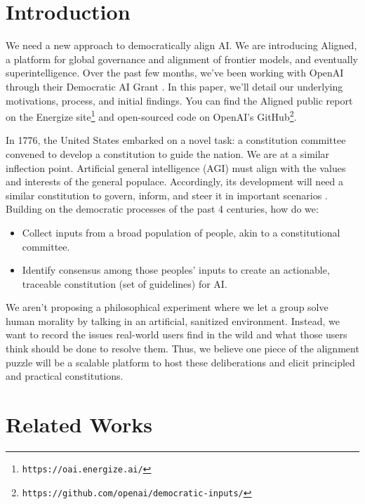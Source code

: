 \documentclass{article}
\begin{document}
\begin{multicols}{2}
\section{Introduction}

We need a new approach to democratically align AI. We are introducing Aligned, a platform for global governance and alignment of frontier models, and eventually superintelligence. Over the past few months, we’ve been working with OpenAI through their Democratic AI Grant \cite{zaremba2023democratic}. In this paper, we’ll detail our underlying motivations, process, and initial findings.  You can find the Aligned public report on the Energize site\footnote{\texttt{https://oai.energize.ai/}} and open-sourced code on OpenAI’s GitHub\footnote{\texttt{https://github.com/openai/democratic-inputs/}}.

In 1776, the United States embarked on a novel task: a constitution committee convened to develop a constitution to guide the nation. We are at a similar inflection point. Artificial general intelligence (AGI) must align with the values and interests of the general populace. Accordingly, its development will need a similar constitution to govern, inform, and steer it in important scenarios \cite{altman2023governance}. Building on the democratic processes of the past 4 centuries, how do we:

\begin{itemize}[itemsep=0pt, topsep=0pt]
    \item Collect inputs from a broad population of people, akin to a constitutional committee.
    \item Identify consensus among those peoples’ inputs to create an actionable, traceable constitution (set of guidelines) for AI.
\end{itemize}

We aren’t proposing a philosophical experiment where we let a group solve human morality by talking in an artificial, sanitized environment. Instead, we want to record the issues real-world users find in the wild and what those users think should be done to resolve them. Thus, we believe one piece of the alignment puzzle will be a scalable platform to host these deliberations and elicit principled and practical constitutions.

\section{Related Works}


\end{multicols}
\end{document}
